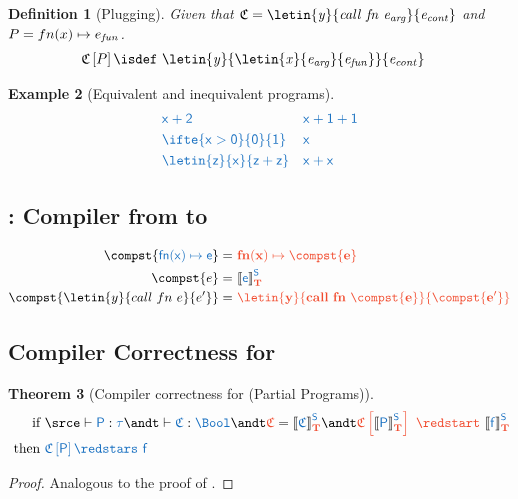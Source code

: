 \documentclass{article}
\newtheorem{theorem}{Theorem}[section]
\newtheorem{definition}[theorem]{Definition}
\theoremstyle{definition}
\newtheorem{example}[theorem]{Example}
\begin{document}
\begin{definition}[Plugging]
Given that $\ctx = \mi{\letin{y}{call~fn~e_{\mi{arg}}}{e_{\mi{cont}}}}$ and $P = fn(x)\mapsto e_{\mathit{fun}}$.
\begin{align*}
		\ctx\hole{P} \isdef&\ 
			\mi{\letin{y}{\letin{x}{e_{arg}}{e_{\mi{fun}}}}{e_{\mi{cont}}}}
\end{align*}
\end{definition}

\begin{example}[Equivalent and inequivalent programs]
	\begin{align*}
		&\src{x+2}
		&
		&\src{x+1+1}
		\\
		&\src{\ifte{x>0}{0}{1}}
		&
		&\src{x}
		\\
		&\src{\letin{z}{x}{z+z}}
		&
		&\src{x+x}
	\end{align*}
\end{example}

\subsection{\compst{\cdot}: Compiler from \So to \To}
\begin{align*}
	\compst{\src{fn(x)\mapsto e}} =&\ \trg{fn(x)\mapsto \compst{e}}
	\\
	\compst{e} =&\ \compgen{e}
	\\
	\compst{\letin{y}{call~fn~e}{e'}} =&\ \trg{\letin{y}{call~fn~\compst{e}}{\compst{e'}}}
\end{align*}


\subsection{Compiler Correctness for \compst{\cdot}}	
\begin{theorem}[Compiler correctness for \compst{\cdot} (Partial Programs)]\label{thm:comp-corr-p}
	\begin{align*}
		\text{if }
		&
		\srce\vdash\src{P}:\src{\tau}
		\andt
		\vdash\src{\ctx}:\src{\Bool}
		\andt
		\trg{\ctx} = \compgen{\ctx}
		\andt
		\trg{ \ctx\hole{\compgen{P}}\ \redstart\ \compgen{f}}
		\\
		\text{ then }
		&
		\src{\ctx\hole{P} \redstars\ f}
	\end{align*}
\end{theorem}
\begin{proof}
	Analogous to the proof of .
\end{proof}
\end{document}
